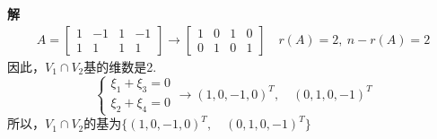 \documentclass[12pt, a4paper, oneside, fontset=none]{ctexart}
\begin{document}
\textbf{解}
\begin{align*}
    A = \begin{bmatrix}
            1 & -1 & 1 & -1 \\
            1 & 1  & 1 & 1
        \end{bmatrix} \rightarrow
    \begin{bmatrix}
        1 & 0 & 1 & 0 \\
        0 & 1 & 0 & 1
    \end{bmatrix} \quad
    r(A) = 2,\ n - r(A) = 2
\end{align*}
因此，$V_1 \cap V_2$基的维数是2.
$$
    \begin{cases}
        \xi_1 + \xi_3 = 0 \\
        \xi_2 + \xi_4 = 0
    \end{cases} \rightarrow
    (1, 0, -1, 0)^T ,\quad  (0, 1, 0, -1)^T
$$
所以，$V_1 \cap V_2$的基为$\{(1, 0, -1, 0)^T ,\quad  (0, 1, 0, -1)^T\}$
\end{document}
